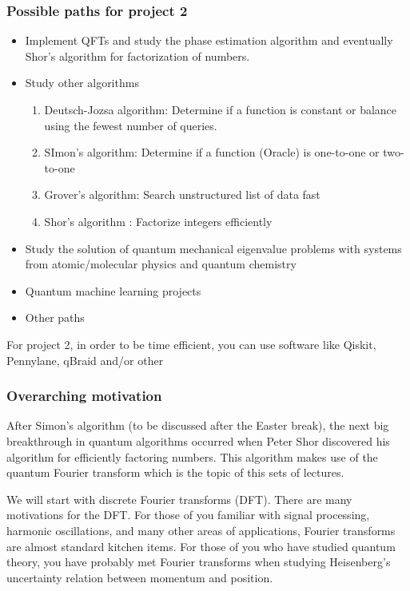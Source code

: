 \documentclass{beamer}
\begin{document}
\begin{frame}
\frametitle{Possible paths for project 2}

\begin{itemize}
\item Implement QFTs  and study the phase estimation algorithm and eventually Shor's algorithm for factorization of numbers.

\item Study other algorithms
\begin{enumerate}

 \item Deutsch-Jozsa algorithm: Determine if a function is constant or balance using the fewest number of queries.

 \item SImon's algorithm: Determine if a function (Oracle) is one-to-one or two-to-one

 \item Grover's algorithm: Search unstructured list of data fast

 \item Shor's algorithm : Factorize integers efficiently

\end{enumerate}

\noindent
\item Study the solution of quantum mechanical eigenvalue problems with systems from atomic/molecular physics and quantum chemistry

\item Quantum machine learning projects

\item Other paths
\end{itemize}

\noindent
For project 2, in order to be time efficient, you can use software like Qiskit, Pennylane, qBraid and/or other
\end{frame}

\begin{frame}
\frametitle{Overarching motivation}

After Simon's algorithm (to be discussed after the Easter break), the next big breakthrough in quantum
algorithms occurred when Peter Shor discovered his algorithm for
efficiently factoring numbers. This algorithm makes use of the quantum
Fourier transform which is the topic of this sets of lectures.

We will start with discrete Fourier transforms (DFT).  There are many
motivations for the DFT. For those of you familiar with signal
processing, harmonic oscillations, and many other areas of
applications, Fourier transforms are almost standard kitchen
items. For those of you who have studied quantum theory, you have
probably met Fourier transforms when studying Heisenberg's uncertainty
relation between momentum and position.
\end{frame}
\end{document}
